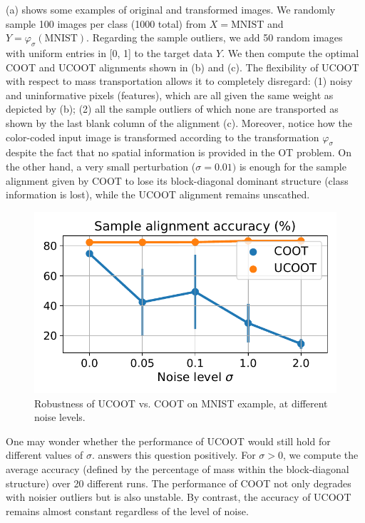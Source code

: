  (a) shows some examples of original and transformed images.
We randomly sample 100 images per class (1000 total) from $X = \text{MNIST}$ and
$Y = \varphi_{\sigma}(\text{MNIST})$. Regarding the sample outliers,
we add 50 random images with uniform entries in [0, 1] to the target data $Y$.
We then compute the optimal COOT and UCOOT alignments shown in
 (b) and (c).
The flexibility of UCOOT with respect to mass transportation allows it to completely disregard:
(1) noisy and uninformative pixels (features),
which are all given the same weight as depicted by (b);
(2) all the sample outliers of which none are transported as shown
by the last blank column of the alignment (c).
Moreover, notice how the color-coded input image is transformed according to
the transformation $\varphi_{\sigma}$ despite the fact that
no spatial information is provided in the OT problem. On the other hand,
a very small perturbation ($\sigma = 0.01)$ is enough for the sample alignment
given by COOT to lose its block-diagonal dominant structure (class information is lost),
while the UCOOT alignment remains unscathed.

\setlength{\intextsep}{0pt}
\begin{figure}
    \centering
    \vspace{-12pt}
    \includegraphics[width=\linewidth]{./Chapitre3/fig/mnist-sigma.pdf}
    \vspace*{-9mm}
    \caption{Robustness of UCOOT vs. COOT on MNIST example, at different noise levels.
    \label{f:mnist-sigma}}
\end{figure}
One may wonder whether the performance of UCOOT would still hold for different values of $\sigma$.
 answers this question positively.
For $\sigma > 0$, we compute the average accuracy
(defined by the percentage of mass within the block-diagonal structure) over 20 different runs.
The performance of COOT not only degrades with noisier outliers but is also unstable.
By contrast, the accuracy of UCOOT remains almost constant regardless of the level of noise.

